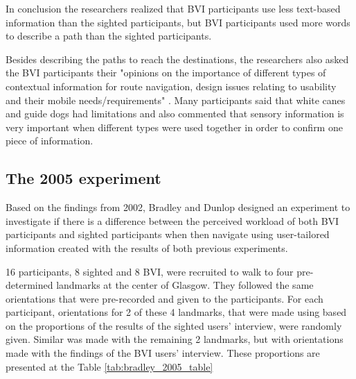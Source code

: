 



In conclusion the researchers realized that BVI participants use less text-based information than the sighted participants, but BVI participants used more words to describe a path than the sighted participants.

Besides describing the paths to reach the destinations, the researchers also asked the BVI participants their "opinions on the importance of different types of contextual information for route navigation, design issues relating to usability and their mobile needs/requirements" \cite{bradley2002investigating}. Many participants said that white canes and guide dogs had limitations and also commented that sensory information is very important when different types were used together in order to confirm one piece of information. 

\subsection{The 2005 experiment}

Based on the findings from 2002, Bradley and Dunlop designed an experiment to investigate if there is a difference between the perceived workload of both BVI participants and sighted participants when then navigate using user-tailored information created with the results of both previous experiments.

16 participants, 8 sighted and 8 BVI, were recruited to walk to four pre-determined landmarks at the center of Glasgow. They followed the same orientations that were pre-recorded and given to the participants. For each participant, orientations for 2 of these 4 landmarks, that were made using based on the proportions of the results of the sighted users' interview, were randomly given. Similar was made with the remaining 2 landmarks, but with orientations made with the findings of the BVI users' interview. These proportions are presented at the Table \ref{tab:bradley_2005_table}

